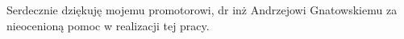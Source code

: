 \dedication{6cm}{%
    Serdecznie dziękuję mojemu promotorowi, dr inż Andrzejowi Gnatowskiemu
    za nieocenioną pomoc w realizacji tej pracy.
    \\[1em]
}